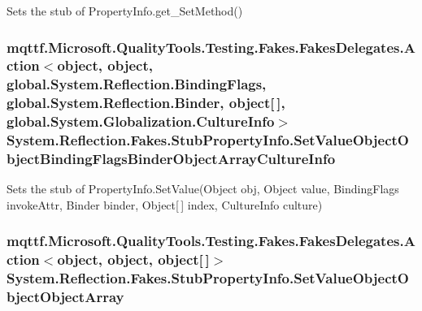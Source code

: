 Sets the stub of Property\-Info.\-get\-\_\-\-Set\-Method()

\hypertarget{class_system_1_1_reflection_1_1_fakes_1_1_stub_property_info_aa38006f3f31b27298685608068aa5a64}{
\subsubsection[{Set\-Value\-Object\-Object\-Binding\-Flags\-Binder\-Object\-Array\-Culture\-Info}]{\setlength{\rightskip}{0pt plus 5cm}mqttf.\-Microsoft.\-Quality\-Tools.\-Testing.\-Fakes.\-Fakes\-Delegates.\-Action$<$object, object, global.\-System.\-Reflection.\-Binding\-Flags, global.\-System.\-Reflection.\-Binder, object\mbox{[}$\,$\mbox{]}, global.\-System.\-Globalization.\-Culture\-Info$>$ System.\-Reflection.\-Fakes.\-Stub\-Property\-Info.\-Set\-Value\-Object\-Object\-Binding\-Flags\-Binder\-Object\-Array\-Culture\-Info}}\label{class_system_1_1_reflection_1_1_fakes_1_1_stub_property_info_aa38006f3f31b27298685608068aa5a64}


Sets the stub of Property\-Info.\-Set\-Value(\-Object obj, Object value, Binding\-Flags invoke\-Attr, Binder binder, Object\mbox{[}$\,$\mbox{]} index, Culture\-Info culture)

\hypertarget{class_system_1_1_reflection_1_1_fakes_1_1_stub_property_info_acba8d139d8960fbb394e39d1546bae4f}{
\subsubsection[{Set\-Value\-Object\-Object\-Object\-Array}]{\setlength{\rightskip}{0pt plus 5cm}mqttf.\-Microsoft.\-Quality\-Tools.\-Testing.\-Fakes.\-Fakes\-Delegates.\-Action$<$object, object, object\mbox{[}$\,$\mbox{]}$>$ System.\-Reflection.\-Fakes.\-Stub\-Property\-Info.\-Set\-Value\-Object\-Object\-Object\-Array}}\label{class_system_1_1_reflection_1_1_fakes_1_1_stub_property_info_acba8d139d8960fbb394e39d1546bae4f}


